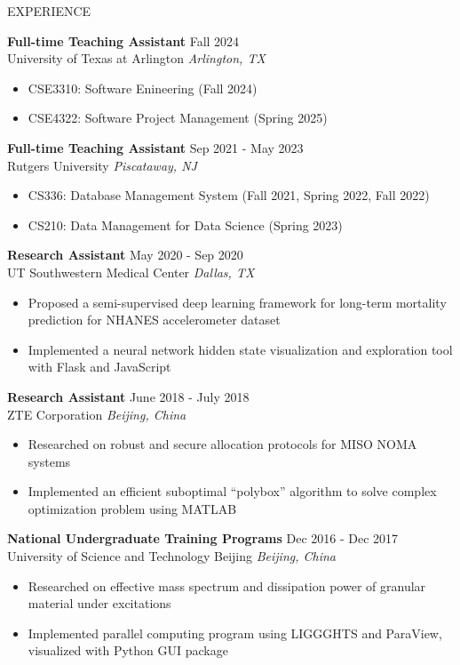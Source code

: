 \documentclass{resume} %
\begin{document}
\vspace{-4pt}
\begin{rSection}{EXPERIENCE}

\textbf{Full-time Teaching Assistant} \hfill Fall 2024\\
University of Texas at Arlington \hfill \textit{Arlington, TX}
 \begin{itemize}
    \itemsep -3pt {} 
     \item CSE3310: Software Enineering (Fall 2024)
     \item CSE4322: Software Project Management (Spring 2025)
 \end{itemize}
 
\textbf{Full-time Teaching Assistant} \hfill Sep 2021 - May 2023\\
Rutgers University \hfill \textit{Piscataway, NJ}
 \begin{itemize}
    \itemsep -3pt {} 
     \item CS336: Database Management System (Fall 2021, Spring 2022, Fall 2022)
     \item CS210: Data Management for Data Science (Spring 2023)
 \end{itemize}
 
\textbf{Research Assistant} \hfill May 2020 - Sep 2020\\
UT Southwestern Medical Center \hfill \textit{Dallas, TX}
 \begin{itemize}
    \itemsep -3pt {} 
     \item Proposed a semi-supervised deep learning framework for long-term mortality prediction for NHANES accelerometer dataset
     \item Implemented a neural network hidden state visualization and exploration tool with Flask and JavaScript
 \end{itemize}

 \textbf{Research Assistant} \hfill June 2018 - July 2018\\
ZTE Corporation \hfill \textit{Beijing, China}
 \begin{itemize}
    \itemsep -3pt {} 
     \item Researched on robust and secure allocation protocols for MISO NOMA systems
     \item Implemented an efficient suboptimal “polybox” algorithm to solve complex optimization problem using MATLAB
 \end{itemize}

  \textbf{National Undergraduate Training Programs} \hfill Dec 2016 - Dec 2017\\
University of Science and Technology Beijing \hfill \textit{Beijing, China}
 \begin{itemize}
    \itemsep -3pt {} 
     \item Researched on effective mass spectrum and dissipation power of granular material under excitations
     \item Implemented parallel computing program using LIGGGHTS and ParaView, visualized with Python GUI package 
 \end{itemize}

\end{rSection} 
\end{document}
